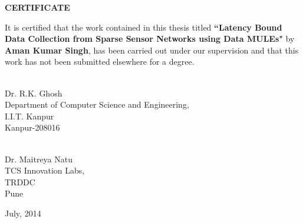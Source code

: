 \setcounter{page}{2}
\vspace*{1.0in}
\begin{center}
\begin{large}
{\bf CERTIFICATE}
\end{large}
\end{center}
\vskip 2cm
It is certified that the work contained in this thesis titled {\bf ``Latency Bound Data Collection from Sparse Sensor Networks using Data MULEs"} by {\bf Aman Kumar Singh}, has been carried out under our supervision and that this work has not been submitted elsewhere for a degree.
\vskip 1in
\begin{flushleft}
		\hspace*{5cm}{\hrulefill}\\
		\hspace*{5cm}Dr. R.K. Ghosh\\
		\hspace*{5cm}Department of Computer Science and Engineering,\\ 
		\hspace*{5cm}I.I.T. Kanpur\\
		\hspace*{5cm}Kanpur-208016
\end{flushleft}
\vskip 1in
\begin{flushleft}
		\hspace*{5cm}{\hrulefill}\\
		\hspace*{5cm}Dr. Maitreya Natu\\
		\hspace*{5cm}TCS Innovation Labs,\\ 
		\hspace*{5cm}TRDDC\\
		\hspace*{5cm}Pune
\end{flushleft}
July, 2014
\pagebreak
